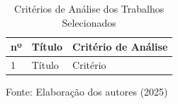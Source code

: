 \begin{center} 
\begin{longtable}{|p{1cm}|p{4cm}|p{10cm}|} 
\caption{Critérios de Análise dos Trabalhos Selecionados} \label{tab:artigos} \\ \hline
\textbf{nº} & \textbf{Título} & \textbf{Critério de Análise} \\ \hline
1 & Título & Critério \\ \hline
\end{longtable}
Fonte: Elaboração dos autores (2025)
\end{center}